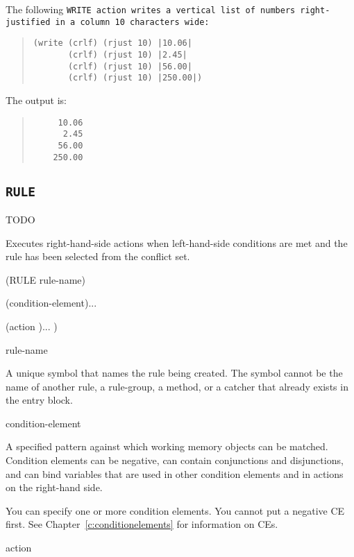 {{\Example

The following \tt{WRITE} action writes a vertical list of numbers
right-justified in a column 10 characters wide:

\begin{quote}
\begin{verbatim}
(write (crlf) (rjust 10) |10.06|
       (crlf) (rjust 10) |2.45|
       (crlf) (rjust 10) |56.00|
       (crlf) (rjust 10) |250.00|)
\end{verbatim}
\end{quote}

The output is:

\begin{quote}
\begin{verbatim}
     10.06
      2.45
     56.00
    250.00
\end{verbatim}
\end{quote}  

\subsection{\tt{RULE}}
TODO

Executes right-hand-side actions when left-hand-side
conditions are met and the rule has been selected from the
conflict set.

\Format

(RULE rule-name)

(condition-element)...

(action )... )

\begin{arguments}
\item[rule-name]

  A unique symbol that names the rule being created. The symbol cannot
  be the name of another rule, a rule-group, a method, or a catcher
  that already exists in the entry block.

\item[condition-element]

  A specified pattern against which working memory objects can be
  matched. Condition elements can be negative, can contain
  conjunctions and disjunctions, and can bind variables that are used
  in other condition elements and in actions on the right-hand side.

  You can specify one or more condition elements. You cannot put a
  negative CE first. See Chapter~\ref{c:conditionelements} for
  information on CEs.

\item[action]


\end{arguments}}}
